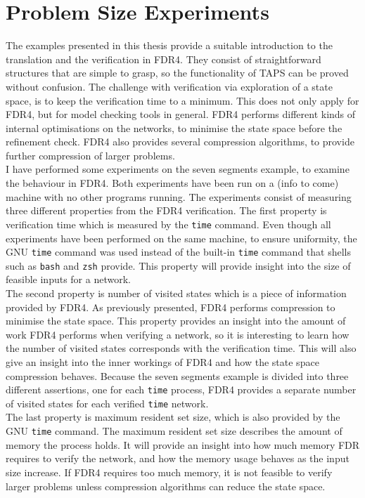 \section{Problem Size Experiments}
The examples presented in this thesis provide a suitable introduction to the translation and the verification in FDR4. They consist of straightforward structures that are simple to grasp, so the functionality of TAPS can be proved without confusion.
The challenge with verification via exploration of a state space, is to keep the verification time to a minimum. This does not only apply for FDR4, but for model checking tools in general. FDR4 performs different kinds of internal optimisations on the networks, to minimise the state space before the refinement check. FDR4 also provides several compression algorithms, to provide further compression of larger problems. \\

I have performed some experiments on the seven segments example, to examine the behaviour in FDR4.
Both experiments have been run on a (info to come) %
machine with no other programs running. The experiments consist of measuring three different properties from the FDR4 verification. The first property is verification time which is measured by the \texttt{time} command. Even though all experiments have been performed on the same machine, to ensure uniformity, the GNU \texttt{time} command was used instead of the built-in \texttt{time} command that shells such as \texttt{bash} and \texttt{zsh} provide. This property will provide insight into the size of feasible inputs for a \cspm{} network.\\

The second property is number of visited states which is a piece of information provided by FDR4.
As previously presented, FDR4 performs compression to minimise the state space.
This property provides an insight into the amount of work FDR4 performs when verifying a network, so it is interesting to learn how the number of visited states corresponds with the verification time. This will also give an insight into the inner workings of FDR4 and how the state space compression behaves.
Because the seven segments example is divided into three different assertions, one for each \texttt{time} process, FDR4 provides a separate number of visited states for each verified \texttt{time} network. \\

The last property is maximum resident set size, which is also provided by the GNU \texttt{time} command. The maximum resident set size describes the amount of memory the process holds. It will provide an insight into how much memory FDR requires to verify the network, and how the memory usage behaves as the input size increase. If FDR4 requires too much memory, it is not feasible to verify larger problems unless compression algorithms can reduce the state space. \\

